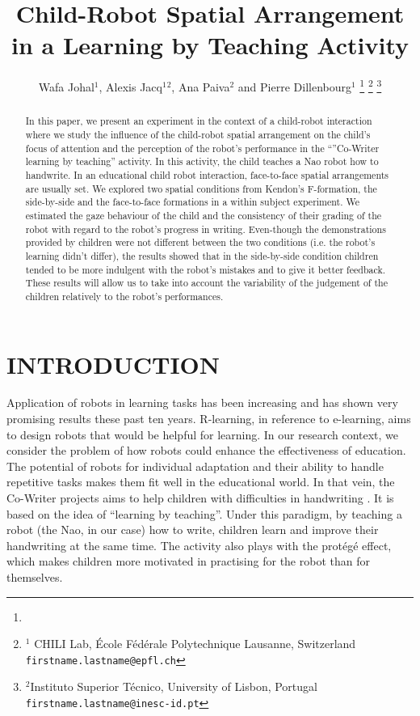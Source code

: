\documentclass[letterpaper, 10 pt, conference]{ieeeconf}  %
\title{\LARGE \bf
Child-Robot Spatial Arrangement in a Learning by Teaching Activity}
\author{Wafa Johal$^{1}$, Alexis Jacq$^{1}$$^{2}$, Ana Paiva$^{2}$ and Pierre Dillenbourg$^{1}$  %
\thanks{}%
\thanks{$^{1}$ CHILI Lab,
        École Fédérale Polytechnique Lausanne, Switzerland
        {\tt\small firstname.lastname@epfl.ch}}%
\thanks{$^{2}$Instituto Superior T\'{e}cnico, University of Lisbon, Portugal
        {\tt\small firstname.lastname@inesc-id.pt}}%
}
\begin{document}
\maketitle


\begin{abstract}
In this paper, we present an experiment in the context of a child-robot interaction where we study the influence of the child-robot spatial arrangement on the child's focus of attention and the perception of the robot's performance in the ``''Co-Writer learning by teaching'' activity.
In this activity, the child teaches a Nao robot how to handwrite.
In an educational child robot interaction, face-to-face spatial arrangements are usually set.
We explored two spatial conditions from Kendon's F-formation, the side-by-side and the face-to-face formations in a within subject experiment.
We estimated the gaze behaviour of the child and the consistency of their grading of the robot with regard to the robot's progress in writing. 
Even-though the demonstrations provided by children were not different between the two conditions (i.e. the robot's learning didn't differ),  the results showed that in the side-by-side condition children tended to be more indulgent with the robot's mistakes and to give it better feedback.
These results will allow us to take into account the variability of the judgement of the children relatively to the robot's performances.
\end{abstract}


\section{INTRODUCTION}

Application of robots in learning tasks has been increasing and has shown very promising results these past ten years. 
R-learning, in reference to e-learning, aims to design robots that would be helpful for learning.
In our research context, we consider the problem of how robots could enhance the effectiveness of education.
The potential of robots for individual adaptation and their ability to handle repetitive tasks makes them fit well in the educational world.
In that vein, the Co-Writer projects aims to help children with difficulties in handwriting \cite{hood2015when}.
It is based on the idea of ``learning by teaching''.
Under this paradigm, by teaching a robot (the Nao, in our case) how to write, children learn and improve their handwriting at the same time.
The activity also plays with the protégé effect, which makes children more motivated in practising for the robot than for themselves.
\end{document}
